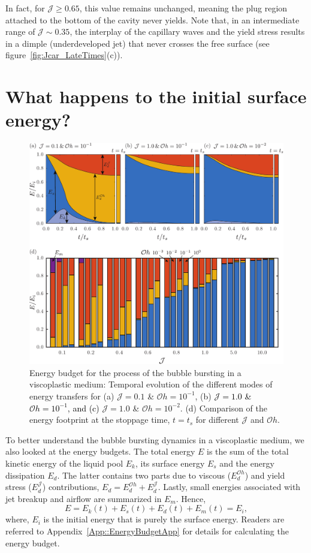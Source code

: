 \documentclass[final]{jfm}
\newcommand*\red{\textcolor{black}}
\begin{document}
In fact, for $\mathcal{J} \ge 0.65$, this value remains unchanged, meaning the plug region attached to the bottom of the cavity never yields. Note that, in an intermediate range of $\mathcal{J} \sim 0.35$, the interplay of the capillary waves and the yield stress results in a dimple (underdeveloped jet) that never crosses the free surface (see figure~\ref{fig:Jcar_LateTimes}(c)). 

\section{What happens to the initial surface energy?}\label{Sec::Energy}
\begin{figure}
	\centerline{\includegraphics[width=\linewidth]{Figures/Figure5-EnergyBudgets-eps-converted-to.pdf}}%
	\caption{Energy budget for the process of the bubble bursting in a viscoplastic medium: Temporal evolution of the different modes of energy transfers for (a) $\mathcal{J} =0.1$ \& $\mathcal{O}h =10^{-1}$, (b) \red{$\mathcal{J} = 1.0$ \& $\mathcal{O}h =10^{-1}$, and (c)} $\mathcal{J} =1.0$ \& $\mathcal{O}h =10^{-2}$. (d) Comparison of the energy footprint at the stoppage time, $t = t_s$ for different $\mathcal{J}$ and $\mathcal{O}h$.}
	\label{fig:EnergyBudget}
\end{figure}
To better understand the bubble bursting dynamics in a viscoplastic medium, we also looked at the energy budgets. The total energy $E$ is the sum of the total kinetic energy of the liquid pool $E_k$, its surface energy $E_s$ and the energy dissipation $E_d$. The latter contains two parts due to viscous ($E_d^{\mathcal{O}h}$) and yield stress ($E_d^\mathcal{J}$) contributions, $E_d = E_d^{\mathcal{O}h} +E_d^\mathcal{J}$. Lastly, small energies associated with jet breakup and airflow are summarized in $E_m$. Hence,
\begin{equation}\label{Eqn::ETotal}
E = E_k(t) + E_s(t) + E_d(t) + E_m(t) = E_i,
\end{equation}
where, $E_i$ is the initial energy that is purely the surface energy. Readers are referred to Appendix~\ref{App::EnergyBudgetApp} for details for calculating the energy budget. 
\end{document}
